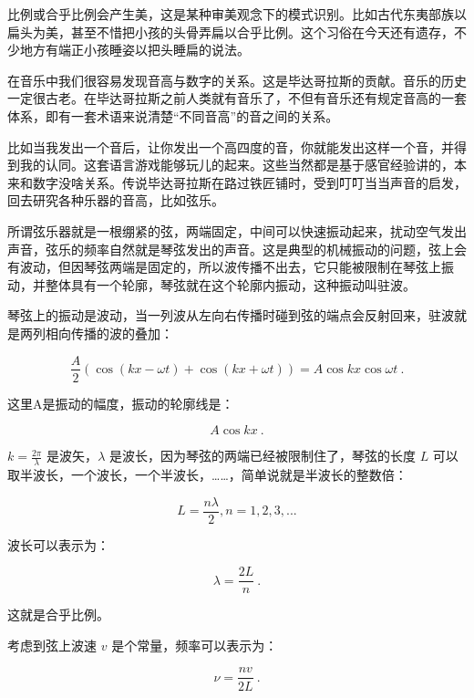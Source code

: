 比例或合乎比例会产生美，这是某种审美观念下的模式识别。比如古代东夷部族以扁头为美，甚至不惜把小孩的头骨弄扁以合乎比例。这个习俗在今天还有遗存，不少地方有端正小孩睡姿以把头睡扁的说法。

在音乐中我们很容易发现音高与数字的关系。这是毕达哥拉斯的贡献。音乐的历史一定很古老。在毕达哥拉斯之前人类就有音乐了，不但有音乐还有规定音高的一套体系，即有一套术语来说清楚“不同音高”的音之间的关系。

比如当我发出一个音后，让你发出一个高四度的音，你就能发出这样一个音，并得到我的认同。这套语言游戏能够玩儿的起来。这些当然都是基于感官经验讲的，本来和数字没啥关系。传说毕达哥拉斯在路过铁匠铺时，受到叮叮当当声音的启发，回去研究各种乐器的音高，比如弦乐。

所谓弦乐器就是一根绷紧的弦，两端固定，中间可以快速振动起来，扰动空气发出声音，弦乐的频率自然就是琴弦发出的声音。这是典型的机械振动的问题，弦上会有波动，但因琴弦两端是固定的，所以波传播不出去，它只能被限制在琴弦上振动，并整体具有一个轮廓，琴弦就在这个轮廓内振动，这种振动叫驻波。

琴弦上的振动是波动，当一列波从左向右传播时碰到弦的端点会反射回来，驻波就是两列相向传播的波的叠加：

\begin{equation}
\frac{A}{2} \left( \cos ( kx - \omega t ) + \cos ( kx + \omega t ) \right) = A \cos kx \cos \omega t~.
\end{equation}

这里A是振动的幅度，振动的轮廓线是：

\begin{equation}
A \cos kx ~.
\end{equation}

$k = \frac{2 \pi}{\lambda}$ 是波矢，$\lambda$ 是波长，因为琴弦的两端已经被限制住了，琴弦的长度 $L$ 可以取半波长，一个波长，一个半波长，……，简单说就是半波长的整数倍：

\begin{equation}
L = \frac{n \lambda}{2}, n = 1, 2, 3, ...
\end{equation}

波长可以表示为：

\begin{equation}
\lambda = \frac{2L}{n}~.
\end{equation}

这就是合乎比例。

考虑到弦上波速 $v$ 是个常量，频率可以表示为：

\begin{equation}
\nu = \frac{n v}{2 L }~.
\end{equation}

